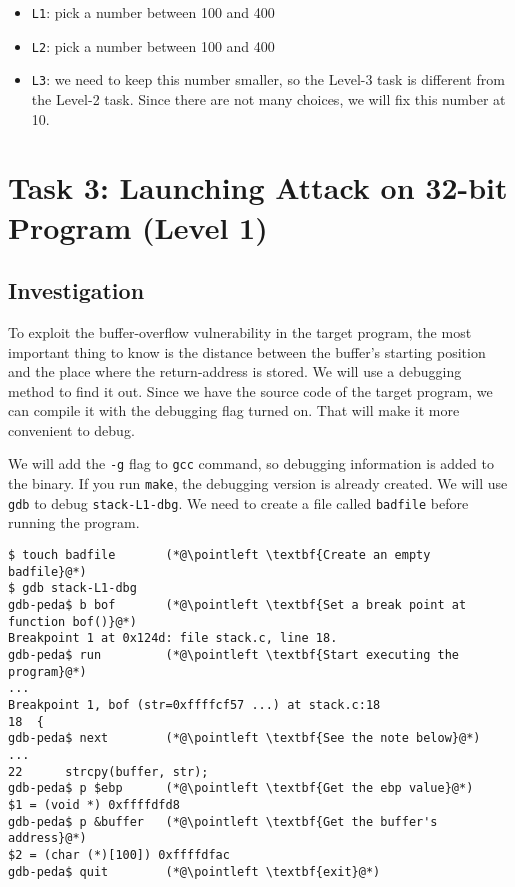 \begin{itemize}[noitemsep]
\item \texttt{L1}: pick a number between 100 and 400 
\item \texttt{L2}: pick a number between 100 and 400 
\item \texttt{L3}: we need to keep this number smaller, so the Level-3 task
is different from the Level-2 task. Since there are not many choices,
we will fix this number at 10.
\end{itemize}
 




\section{Task 3: Launching Attack on 32-bit Program (Level 1)}

\subsection{Investigation} 

To exploit the buffer-overflow vulnerability in the target program,
the most important thing to know is the distance between the 
buffer's starting position and the place where the return-address
is stored. We will use a debugging method to find it out.
Since we have the source code of the target program, we
can compile it with the debugging flag turned on. That will make it more
convenient to debug. 

We will add the \texttt{-g} flag to \texttt{gcc} command, so debugging information
is added to the binary. If you run \texttt{make}, the debugging version
is already created. We will use \texttt{gdb} to debug \texttt{stack-L1-dbg}.  
We need to create a file called
\texttt{badfile} before running the program. 


\newcommand{\pointleft}{\reflectbox{\ding{221}}\xspace}

\begin{lstlisting}
$ touch badfile       (*@\pointleft \textbf{Create an empty badfile}@*)
$ gdb stack-L1-dbg
gdb-peda$ b bof       (*@\pointleft \textbf{Set a break point at function bof()}@*)
Breakpoint 1 at 0x124d: file stack.c, line 18.
gdb-peda$ run         (*@\pointleft \textbf{Start executing the program}@*)
...
Breakpoint 1, bof (str=0xffffcf57 ...) at stack.c:18
18  {
gdb-peda$ next        (*@\pointleft \textbf{See the note below}@*)
...
22	    strcpy(buffer, str);
gdb-peda$ p $ebp      (*@\pointleft \textbf{Get the ebp value}@*)
$1 = (void *) 0xffffdfd8   
gdb-peda$ p &buffer   (*@\pointleft \textbf{Get the buffer's address}@*)
$2 = (char (*)[100]) 0xffffdfac
gdb-peda$ quit        (*@\pointleft \textbf{exit}@*)
\end{lstlisting}

